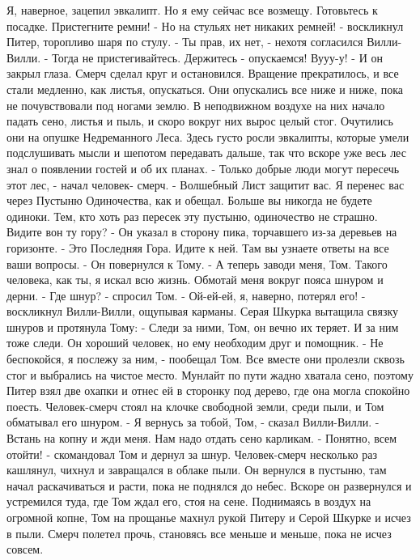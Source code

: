 Я, наверное, зацепил эвкалипт. Но я ему сейчас все возмещу. Готовьтесь 
к посадке. Пристегните ремни!
    - Но на стульях нет никаких ремней! - воскликнул Питер, торопливо 
шаря по стулу.
    - Ты прав, их нет, - нехотя согласился Вилли-Вилли. - Тогда не 
пристегивайтесь. Держитесь - опускаемся! Вууу-у! - И он закрыл глаза.
    Смерч сделал круг и остановился. Вращение прекратилось, и все 
стали медленно, как листья, опускаться. Они опускались все ниже и 
ниже, пока не почувствовали под ногами землю. В неподвижном воздухе на 
них начало падать сено, листья и пыль, и скоро вокруг них вырос целый 
стог.
    Очутились они на опушке Недреманного Леса. Здесь густо росли 
эвкалипты, которые умели подслушивать мысли и шепотом передавать 
дальше, так что вскоре уже весь лес знал о появлении гостей и об их 
планах.
    - Только добрые люди могут пересечь этот лес, - начал человек-
смерч. - Волшебный Лист защитит вас. Я перенес вас через Пустыню 
Одиночества, как и обещал. Больше вы никогда не будете одиноки. Тем, 
кто хоть раз пересек эту пустыню, одиночество не страшно. Видите вон 
ту гору? - Он указал в сторону пика, торчавшего из-за деревьев на 
горизонте. - Это Последняя Гора. Идите к ней. Там вы узнаете ответы на 
все ваши вопросы. - Он повернулся к Тому. - А теперь заводи меня, Том. 
Такого человека, как ты, я искал всю жизнь. Обмотай меня вокруг пояса 
шнуром и дерни.
    - Где шнур? - спросил Том.
    - Ой-ей-ей, я, наверно, потерял его! - воскликнул Вилли-Вилли, 
ощупывая карманы.
    Серая Шкурка вытащила связку шнуров и протянула Тому:
    - Следи за ними, Том, он вечно их теряет. И за ним тоже следи. Он 
хороший человек, но ему необходим друг и помощник.
    - Не беспокойся, я послежу за ним, - пообещал Том.
    Все вместе они пролезли сквозь стог и выбрались на чистое место. 
Мунлайт по пути жадно хватала сено, поэтому Питер взял две охапки и 
отнес ей в сторонку под дерево, где она могла спокойно поесть.
    Человек-смерч стоял на клочке свободной земли, среди пыли, и Том 
обматывал его шнуром.
    - Я вернусь за тобой, Том, - сказал Вилли-Вилли. - Встань на копну 
и жди меня. Нам надо отдать сено карликам.
    - Понятно, всем отойти! - скомандовал Том и дернул за шнур. 
Человек-смерч несколько раз кашлянул, чихнул и завращался в облаке 
пыли. Он вернулся в пустыню, там начал раскачиваться и расти, пока не 
поднялся до небес. Вскоре он развернулся и устремился туда, где Том 
ждал его, стоя на сене. Поднимаясь в воздух на огромной копне, Том на 
прощанье махнул рукой Питеру и Серой Шкурке и исчез в пыли. Смерч 
полетел прочь, становясь все меньше и меньше, пока не исчез совсем.

